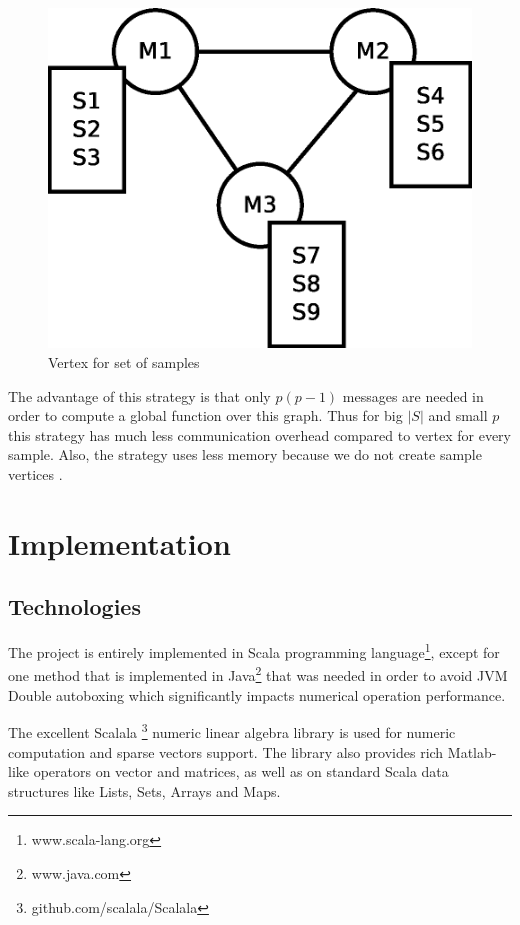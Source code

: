 \documentclass{report}
\begin{document}
\begin{figure}[!htb]
  \centering
  \includegraphics*[scale=0.45]{graph2.eps}
  \caption{Vertex for set of samples}
  \label{fig:vss:graph2}
\end{figure}

The advantage of this strategy is that only $p(p-1)$ messages are needed in order to compute a global function over this graph. Thus for big $|S|$ and small $p$ this strategy has much less communication overhead compared to vertex for every sample. Also, the strategy uses less memory because we do not create sample vertices .

\chapter{Implementation}

\section{Technologies}

The project is entirely implemented in Scala programming language\footnote{www.scala-lang.org}, except for one method that is implemented in Java\footnote{www.java.com} that was needed in order to avoid JVM Double autoboxing which significantly impacts numerical operation performance.

The excellent Scalala \footnote{github.com/scalala/Scalala} numeric linear algebra library is used for numeric computation and sparse vectors support. The library also provides rich Matlab-like operators on vector and matrices, as well as on standard Scala data structures like Lists, Sets, Arrays and Maps.
 
\end{document}
